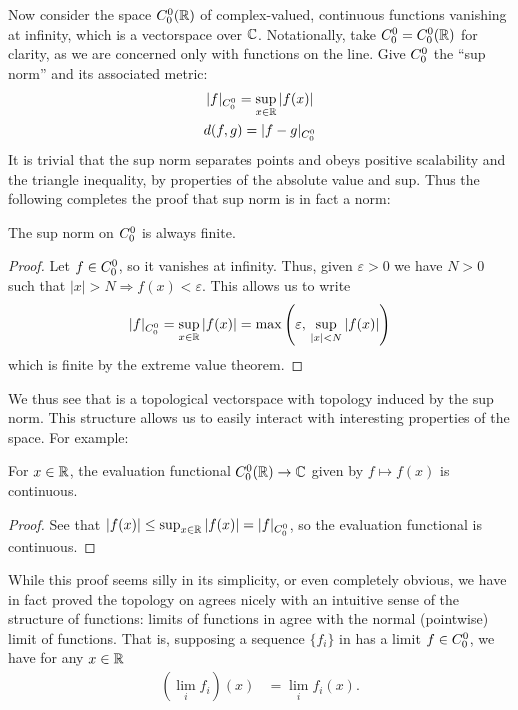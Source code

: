       Now consider the space ${C^0_0}(\mathbb{R})$ of complex-valued, continuous functions vanishing at infinity, which is a vectorspace over $\mathbb{C}$.
      Notationally, take ${C^0_0}={C^0_0}(\mathbb{R})$ for clarity, as we are concerned only with functions on the line.
      Give ${C^0_0}$ the ``sup norm'' and its associated metric:
      \begin{gather*}
        |f|_{C^0_0} = \sup_{x\in\mathbb{R}}|f(x)|\\
        d(f,g) = |f-g|_{C^0_0}
      \end{gather*}
      It is trivial that the sup norm separates points and obeys positive scalability and the triangle inequality, by properties of the absolute value and sup.
      Thus the following completes the proof that sup norm is in fact a norm:
      \begin{claim}
        The sup norm on ${C^0_0}$ is always finite.
        \begin{proof}
          Let $f\in {C^0_0}$, so it vanishes at infinity.
          Thus, given $\varepsilon>0$ we have $N>0$ such that $|x|>N\Rightarrow f(x)<\varepsilon$.
          This allows us to write
          \begin{align*}
            |f|_{C^0_0}
            = \sup_{x\in\mathbb{R}}|f(x)|
            = \max\left(\varepsilon,\,\sup_{|x|<N}|f(x)|\right)
          \end{align*}
          which is finite by the extreme value theorem.
        \end{proof}
      \end{claim}
      We thus see that \Coo is a topological vectorspace with topology induced by the sup norm.
      This structure allows us to easily interact with interesting properties of the space.
      For example:
      \begin{claim}
        \label{claim:c00evalcts}
        For $x\in\mathbb{R}$, the evaluation functional ${C^0_0}(\mathbb{R})\rightarrow\mathbb{C}$ given by $f\mapsto f(x)$ is continuous.
        \begin{proof}
          See that $|f(x)| \le \sup_{x\in\mathbb{R}} |f(x)| = |f|_{C^0_0}$, so the evaluation functional is continuous.
        \end{proof}
      \end{claim}
      \begin{rmk}
        \label{cor:limitworks}
        While this proof seems silly in its simplicity, or even completely obvious, we have in fact proved the topology on \Coo agrees nicely with an intuitive sense of the structure of functions: limits of functions in \Coo agree with the normal (pointwise) limit of functions.
        That is, supposing a sequence $\{f_i\}$ in \Coo has a limit $f\in{C^0_0}$, we have for any $x\in\mathbb{R}$
        \begin{align*}
          (\lim_i f_i)(x) &= \lim_i f_i(x)\text{.}
        \end{align*}
      \end{rmk}

